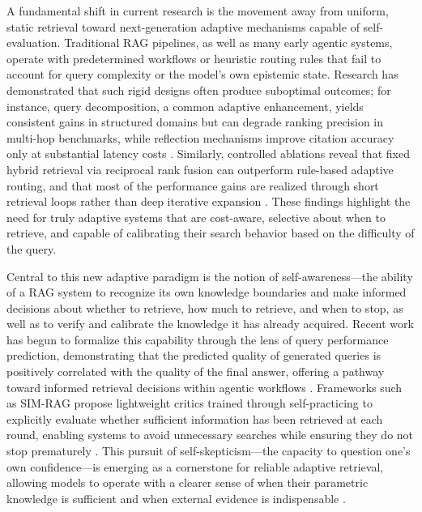 \documentclass[11pt]{article}
\begin{document}
A fundamental shift in current research is the movement away from uniform, static retrieval toward next-generation adaptive mechanisms capable of self-evaluation. Traditional RAG pipelines, as well as many early agentic systems, operate with predetermined workflows or heuristic routing rules that fail to account for query complexity or the model's own epistemic state. Research has demonstrated that such rigid designs often produce suboptimal outcomes; for instance, query decomposition, a common adaptive enhancement, yields consistent gains in structured domains but can degrade ranking precision in multi-hop benchmarks, while reflection mechanisms improve citation accuracy only at substantial latency costs \cite{ref31}. Similarly, controlled ablations reveal that fixed hybrid retrieval via reciprocal rank fusion can outperform rule-based adaptive routing, and that most of the performance gains are realized through short retrieval loops rather than deep iterative expansion \cite{ref305}. These findings highlight the need for truly adaptive systems that are cost-aware, selective about when to retrieve, and capable of calibrating their search behavior based on the difficulty of the query.

Central to this new adaptive paradigm is the notion of self-awareness---the ability of a RAG system to recognize its own knowledge boundaries and make informed decisions about whether to retrieve, how much to retrieve, and when to stop, as well as to verify and calibrate the knowledge it has already acquired. Recent work has begun to formalize this capability through the lens of query performance prediction, demonstrating that the predicted quality of generated queries is positively correlated with the quality of the final answer, offering a pathway toward informed retrieval decisions within agentic workflows \cite{ref319}. Frameworks such as SIM-RAG propose lightweight critics trained through self-practicing to explicitly evaluate whether sufficient information has been retrieved at each round, enabling systems to avoid unnecessary searches while ensuring they do not stop prematurely \cite{ref282}. This pursuit of self-skepticism---the capacity to question one's own confidence---is emerging as a cornerstone for reliable adaptive retrieval, allowing models to operate with a clearer sense of when their parametric knowledge is sufficient and when external evidence is indispensable \cite{ref609}.
\end{document}
